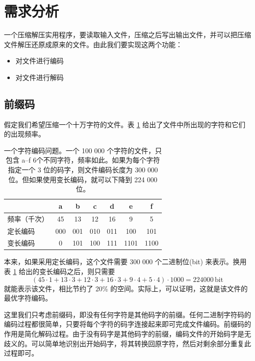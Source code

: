 \section{需求分析}

一个压缩解压实用程序，要读取输入文件，压缩之后写出输出文件，并可以把压缩文件解压还原成原来的文件。由此我们要实现这两个功能：
\begin{itemize}
\item 对文件进行编码
\item 对文件进行解码
\end{itemize}

\subsection{前缀码}

假定我们希望压缩一个十万字符的文件。表 \ref{basetable} 给出了文件中所出现的字符和它们的出现频率。

\begin{table}[htbp]
\begin{center}
\begin{tabular}{|l|cccccc|}\hline
 & a & b & c & d & e & f \\\hline
频率（千次） & 45 & 13 & 12 & 16 & 9 & 5 \\
定长编码 & 000 & 001 & 010 & 011 & 100 & 101 \\
变长编码 & 0 & 101 & 100 & 111 & 1101 & 1100 \\\hline
\end{tabular}
\end{center}
\caption{\label{basetable}一个字符编码问题。一个 100 000 个字符的文件，只包含 a--f 6个不同字符，频率如此。如果为每个字符指定一个 3 位的码字，则文件编码长度为 300 000 位。但如果使用变长编码，就可以下降到 224 000 位。}
\end{table}

本来，如果采用定长编码，这个文件需要 300 000 个二进制位(bit) 来表示。换用表 \ref{basetable} 给出的变长编码之后，则只需要
\[ (45\cdot 1 + 13\cdot 3 + 12\cdot 3 + 16\cdot 3 + 9\cdot 4 + 5\cdot 4)\cdot 1 000 = 224 000\,{\mathrm{bit}} \]
就能表示该文件，相比节约了 20\% 的空间。实际上，可以证明，这就是该文件的最优字符编码。

这里我们只考虑前缀码，即没有任何字符是其他码字的前缀。任何二进制字符码的编码过程都很简单，只要将每个字符的码字连接起来即可完成文件编码。前缀码的作用是简化解码过程。由于没有码字是其他码字的前缀，编码文件的开始码字是无歧义的。可以简单地识别出开始码字，将其转换回原字符，然后对剩余部分重复此过程即可。

